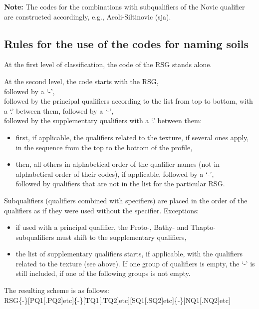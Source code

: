 \documentclass[
  letterpaper,
  DIV=11,
  numbers=noendperiod]{scrreprt}
\providecommand{\tightlist}{%
  \setlength{\itemsep}{0pt}\setlength{\parskip}{0pt}}\usepackage{longtable,booktabs,array}
\begin{document}
\textbf{Note:} The codes for the combinations with subqualifiers of the
Novic qualifier are constructed accordingly, e.g., Aeoli-Siltinovic
(sja).

\hypertarget{rules-for-the-use-of-the-codes-for-naming-soils}{%
\subsection{Rules for the use of the codes for naming
soils}\label{rules-for-the-use-of-the-codes-for-naming-soils}}

At the first level of classification, the code of the RSG stands alone.

At the second level, the code starts with the RSG,\\
followed by a `-',\\
followed by the principal qualifiers according to the list from top to
bottom, with a `.' between them, followed by a `-',\\
followed by the supplementary qualifiers with a `.' between them:

\begin{itemize}
\tightlist
\item
  first, if applicable, the qualifiers related to the texture, if
  several ones apply, in the sequence from the top to the bottom of the
  profile,
\item
  then, all others in alphabetical order of the qualifier names (not in
  alphabetical order of their codes), if applicable, followed by a
  `-',\\
  followed by qualifiers that are not in the list for the particular
  RSG.
\end{itemize}

Subqualifiers (qualifiers combined with specifiers) are placed in the
order of the qualifiers as if they were used without the specifier.
Exceptions:

\begin{itemize}
\tightlist
\item
  if used with a principal qualifier, the Proto-, Bathy- and Thapto-
  subqualifiers must shift to the supplementary qualifiers,
\item
  the list of supplementary qualifiers starts, if applicable, with the
  qualifiers related to the texture (see above). If one group of
  qualifiers is empty, the `-' is still included, if one of the
  following groups is not empty.
\end{itemize}

The resulting scheme is as follows:\\
RSG\{-\}{[}PQ1{[}.PQ2{]}etc{]}\{-\}{[}TQ1{[}.TQ2{]}etc{]}{[}SQ1{[}.SQ2{]}etc{]}\{-\}{[}NQ1{[}.NQ2{]}etc{]}
\end{document}
